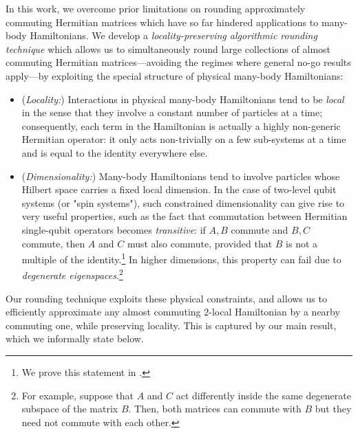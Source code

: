 \documentclass[11pt]{article}
\theoremstyle{plain}
\begin{document}
In this work, we overcome prior limitations on rounding 
approximately commuting Hermitian matrices which have so far hindered 
applications to many-body Hamiltonians. We develop a 
\emph{locality-preserving algorithmic rounding technique} which allows us to 
simultaneously
round large collections of almost commuting Hermitian matrices---avoiding the regimes where 
general no-go results apply---by exploiting the special structure of physical many-body Hamiltonians:
\begin{itemize}
\item (\emph{Locality:}) Interactions in physical many-body Hamiltonians tend 
to be \emph{local} in the sense that they involve a constant number of 
particles at a time; consequently, each term in the Hamiltonian is 
actually a 
highly non-generic Hermitian operator: it only acts non-trivially on a 
few sub-systems at a time and is equal to the identity everywhere else.

\item (\emph{Dimensionality:}) Many-body Hamiltonians tend to 
involve particles whose Hilbert space carries a fixed local dimension. 
In the case of two-level qubit systems (or "spin systems"), such constrained dimensionality can give rise to very useful properties, such as the fact that commutation between Hermitian single-qubit operators becomes 
\emph{transitive}: if $A,B$ commute and $B,C$ 
commute, then $A$ and $C$ must also commute, provided that $B$ is not 
a multiple of the identity.\footnote{We prove this statement in .} In higher dimensions, this property can fail due to \emph{degenerate eigenspaces}.\footnote{For example, suppose that $A$ and $C$ act differently inside the same degenerate subspace of the matrix $B$. Then, both matrices can commute with $B$ but they need not commute with each other.}
\end{itemize}




Our rounding technique exploits these physical constraints, 
and allows us to
efficiently approximate any almost commuting $2$-local 
Hamiltonian by a nearby commuting one, while preserving locality.
This is captured by our main 
result, which we informally state below.
\end{document}
